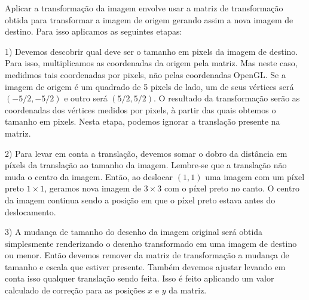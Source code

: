 {Aplicar a transformação da imagem envolve usar a matriz de
transformação obtida para transformar a imagem de origem gerando assim
a nova imagem de destino. Para isso aplicamos as seguintes etapas:

1) Devemos descobrir qual deve ser o tamanho em pixels da imagem de
destino. Para isso, multiplicamos as coordenadas da origem pela
matriz. Mas neste caso, medidmos tais coordenadas por pixels, não
pelas coordenadas OpenGL. Se a imagem de origem é um quadrado de 5
pixels de lado, um de seus vértices será $(-5/2, -5/2)$ e outro será
$(5/2, 5/2)$. O resultado da transformação serão as coordenadas dos
vértices medidos por pixels, à partir das quais obtemos o tamanho em
pixels. Nesta etapa, podemos ignorar a translação presente na matriz.

2) Para levar em conta a translação, devemos somar o dobro da
distância em píxels da translação ao tamanho da imagem. Lembre-se que a
translação não muda o centro da imagem. Então, ao deslocar $(1, 1)$
uma imagem com um píxel preto $1\times 1$, geramos nova imagem de
$3\times 3$ com o píxel preto no canto. O centro da imagem continua
sendo a posição em que o píxel preto estava antes do deslocamento.

3) A mudança de tamanho do desenho da imagem original será obtida
simplesmente renderizando o desenho transformado em uma imagem de
destino ou menor. Então devemos remover da matriz de transformação a
mudança de tamanho e escala que estiver presente. Também devemos
ajustar levando em conta isso qualquer translação sendo feita. Isso é
feito aplicando um valor calculado de correção para as posições $x$ e
$y$ da matriz.

}
